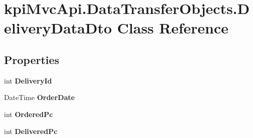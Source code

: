 \hypertarget{classkpi_mvc_api_1_1_data_transfer_objects_1_1_delivery_data_dto}{}\section{kpi\+Mvc\+Api.\+Data\+Transfer\+Objects.\+Delivery\+Data\+Dto Class Reference}
\label{classkpi_mvc_api_1_1_data_transfer_objects_1_1_delivery_data_dto}
\subsection*{Properties}
\begin{DoxyCompactItemize}
\item 
\mbox{\label{classkpi_mvc_api_1_1_data_transfer_objects_1_1_delivery_data_dto_a8f6965e8bdcf31bdee6f80e9b0765960}} 
int {\bfseries Delivery\+Id}
\item 
\mbox{\label{classkpi_mvc_api_1_1_data_transfer_objects_1_1_delivery_data_dto_a1271691303d2c59f50c73ba61f9e3699}} 
Date\+Time {\bfseries Order\+Date}
\item 
\mbox{\label{classkpi_mvc_api_1_1_data_transfer_objects_1_1_delivery_data_dto_adb037f0bf28ad3eacbe2899fa0ba1f9f}} 
int {\bfseries Ordered\+Pc}
\item 
\mbox{\label{classkpi_mvc_api_1_1_data_transfer_objects_1_1_delivery_data_dto_a2e51fc184e36416aea8d5c40d967cff8}} 
int {\bfseries Delivered\+Pc}
\item 
\mbox{\label{classkpi_mvc_api_1_1_data_transfer_objects_1_1_delivery_data_dto_a83f2e47d59493febe35f4f52dd50616e}} 

\end{DoxyCompactItemize}
